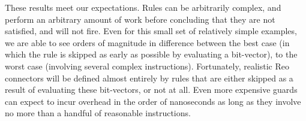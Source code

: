 These results meet our expectations. Rules can be arbitrarily complex, and perform an arbitrary amount of work before concluding that they are not satisfied, and will not fire. Even for this small set of relatively simple examples, we are able to see orders of magnitude in difference between the best case (in which the rule is skipped as early as possible by evaluating a bit-vector), to the worst case (involving several complex instructions). Fortunately, realistic Reo connectors will be defined almost entirely by rules that are either skipped as a result of evaluating these bit-vectors, or not at all. Even more expensive guards can expect to incur overhead in the order of nanoseconds as long as they involve no more than a handful of reasonable instructions. 

\begin{figure}
	\centering
\end{figure}
